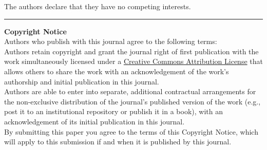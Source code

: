 \documentclass{jors}
\begin{document}
The authors declare that they have no competing interests.



\vspace{2cm}

\rule{\textwidth}{1pt}

{ \bf Copyright Notice} \\
Authors who publish with this journal agree to the following terms: \\

Authors retain copyright and grant the journal right of first publication with the work simultaneously licensed under a  \href{http://creativecommons.org/licenses/by/3.0/}{Creative Commons Attribution License} that allows others to share the work with an acknowledgement of the work's authorship and initial publication in this journal. \\

Authors are able to enter into separate, additional contractual arrangements for the non-exclusive distribution of the journal's published version of the work (e.g., post it to an institutional repository or publish it in a book), with an acknowledgement of its initial publication in this journal. \\

By submitting this paper you agree to the terms of this Copyright Notice, which will apply to this submission if and when it is published by this journal.
\end{document}
